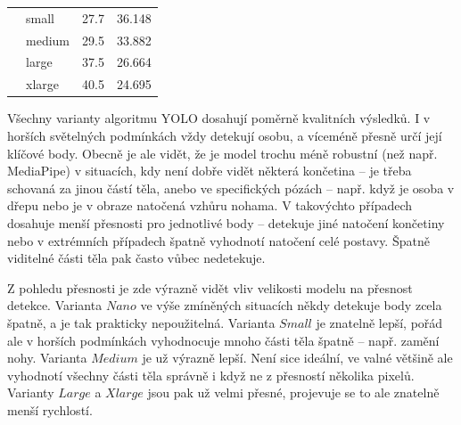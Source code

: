 \begin{table}[htbp]
\begin{tabular}{|c|l|l|l|}
                                           & small          & 27.7                    & 36.148                   \\ \cline{2-4}
                                           & medium         & 29.5                    & 33.882                   \\ \cline{2-4}
                                           & large          & 37.5                    & 26.664                   \\ \cline{2-4}
                                           & xlarge         & 40.5                    & 24.695                   \\ \hline
    \end{tabular}
\end{table}

Všechny varianty algoritmu YOLO dosahují poměrně kvalitních výsledků. I v
horších světelných podmínkách vždy detekují osobu, a víceméně přesně určí její
klíčové body. Obecně je ale vidět, že je model trochu méně robustní (než např.
MediaPipe) v situacích, kdy není dobře vidět některá končetina – je třeba
schovaná za jinou částí těla, anebo ve specifických pózách – např. když je
osoba v dřepu nebo je v obraze natočená vzhůru nohama. V takovýchto případech
dosahuje menší přesnosti pro jednotlivé body – detekuje jiné natočení končetiny
nebo v extrémních případech špatně vyhodnotí natočení celé postavy. Špatně
viditelné části těla pak často vůbec nedetekuje.

Z pohledu přesnosti je zde výrazně vidět vliv velikosti modelu na přesnost
detekce. Varianta $Nano$ ve výše zmíněných situacích někdy detekuje body zcela
špatně, a je tak prakticky nepoužitelná. Varianta $Small$ je znatelně lepší,
pořád ale v horších podmínkách vyhodnocuje mnoho části těla špatně – např.
zamění nohy. Varianta $Medium$ je už výrazně lepší. Není sice ideální, ve valné
většině ale vyhodnotí všechny části těla správně i když ne z přesností několika
pixelů. Varianty $Large$ a $Xlarge$ jsou pak už velmi přesné, projevuje se to
ale znatelně menší rychlostí.

